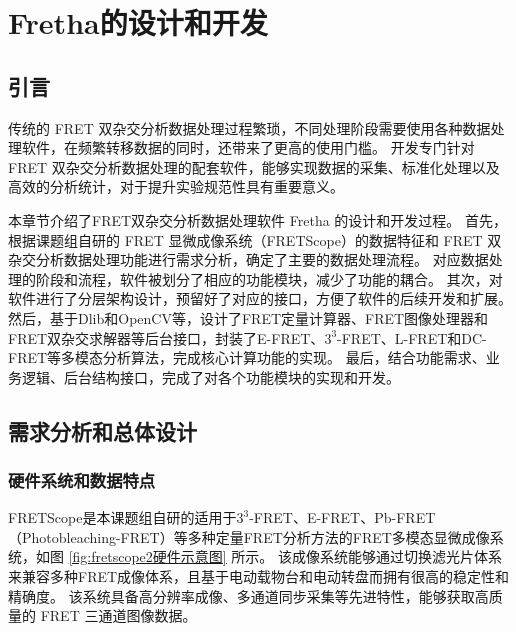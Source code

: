 \chapter{Fretha的设计和开发}

\section{引言}
传统的 FRET 双杂交分析数据处理过程繁琐，不同处理阶段需要使用各种数据处理软件，在频繁转移数据的同时，还带来了更高的使用门槛。
开发专门针对 FRET 双杂交分析数据处理的配套软件，能够实现数据的采集、标准化处理以及高效的分析统计，对于提升实验规范性具有重要意义。

本章节介绍了FRET双杂交分析数据处理软件 Fretha 的设计和开发过程。
首先，根据课题组自研的 FRET 显微成像系统（FRETScope）的数据特征和 FRET 双杂交分析数据处理功能进行需求分析，确定了主要的数据处理流程。
对应数据处理的阶段和流程，软件被划分了相应的功能模块，减少了功能的耦合。
其次，对软件进行了分层架构设计，预留好了对应的接口，方便了软件的后续开发和扩展。
然后，基于Dlib和OpenCV等，设计了FRET定量计算器、FRET图像处理器和FRET双杂交求解器等后台接口，封装了E-FRET、$3^3$-FRET、L-FRET和DC-FRET等多模态分析算法，完成核心计算功能的实现。
最后，结合功能需求、业务逻辑、后台结构接口，完成了对各个功能模块的实现和开发。

\section{需求分析和总体设计}

\subsection{硬件系统和数据特点}

FRETScope是本课题组自研的适用于$3^3$-FRET、E-FRET、Pb-FRET（Photobleaching-FRET）等多种定量FRET分析方法的FRET多模态显微成像系统，如图 \ref{fig:fretscope2硬件示意图} 所示。
该成像系统能够通过切换滤光片体系来兼容多种FRET成像体系，且基于电动载物台和电动转盘而拥有很高的稳定性和精确度。
该系统具备高分辨率成像、多通道同步采集等先进特性，能够获取高质量的 FRET 三通道图像数据。

